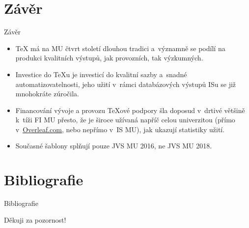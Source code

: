 \documentclass[
  aspectratio=169,
]{beamer}
\makeatletter
\newcommand\odkaz[2]{\textcolor{mubeamer@base}{\uline{\href{#1}{#2}}}}
\makeatother
\begin{document}
\section{Závěr}

\begin{frame}{Závěr}
\begin{itemize}
\item \alert{\TeX{} má na MU čtvrt století dlouhou tradici} a~významně se podílí na produkci kvalitních výstupů, jak provozních, tak výzkumných.
\item Investice do \TeX u je investicí do \alert{kvalitní sazby} a~\alert{snadné automatizovatelnosti}, jeho užití v~rámci databázových výstupů ISu se již mnohokráte zúročila. 
\item Financování vývoje a provozu \TeX ové podpory šla doposud v~drtivé většině k~tíži FI MU přesto, že je \alert{široce užívaná napříč celou univerzitou} (přímo v~\odkaz{https://www.overleaf.com/edu/fimuni}{Overleaf.com}, nebo nepřímo v~IS MU), jak ukazují statistiky užití.
\item Současné šablony splňují pouze JVS MU 2016, ne JVS MU 2018.
\end{itemize}
\end{frame}

\section{Bibliografie}

\begin{frame}{Bibliografie}

\end{frame}

\begin{frame}[plain]
\vfill
\centerline{Děkuji za pozornost!}
\vfill\vfill
\end{frame}
\end{document}
